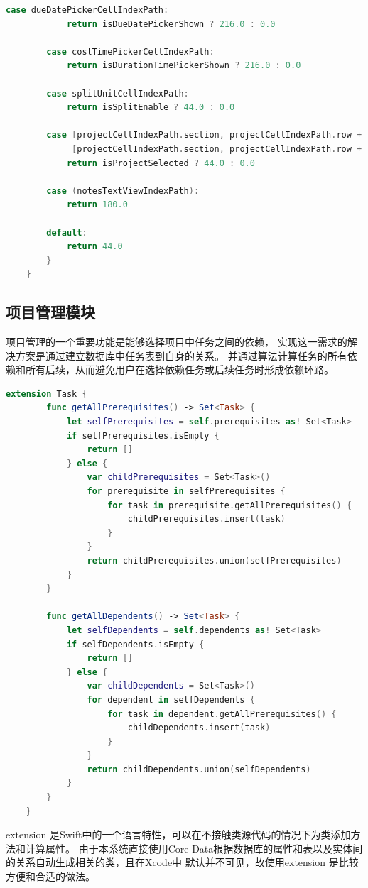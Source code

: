 \begin{lstlisting}[language={Swift}, caption={动态调整行高以便输入}]
        case dueDatePickerCellIndexPath:
            return isDueDatePickerShown ? 216.0 : 0.0
        
        case costTimePickerCellIndexPath:
            return isDurationTimePickerShown ? 216.0 : 0.0
        
        case splitUnitCellIndexPath:
            return isSplitEnable ? 44.0 : 0.0
            
        case [projectCellIndexPath.section, projectCellIndexPath.row + 1],
             [projectCellIndexPath.section, projectCellIndexPath.row + 2]:
            return isProjectSelected ? 44.0 : 0.0
            
        case (notesTextViewIndexPath):
            return 180.0
        
        default:
            return 44.0
        }
    }
\end{lstlisting}

\subsection{项目管理模块}
项目管理的一个重要功能是能够选择项目中任务之间的依赖，
实现这一需求的解决方案是通过建立数据库中任务表到自身的关系。
并通过算法计算任务的所有依赖和所有后续，从而避免用户在选择依赖任务或后续任务时形成依赖环路。

\begin{lstlisting}[language={Swift}, caption={计算任务依赖关系的代码}]
	extension Task {
		func getAllPrerequisites() -> Set<Task> {
			let selfPrerequisites = self.prerequisites as! Set<Task>
			if selfPrerequisites.isEmpty {
				return []
			} else {
				var childPrerequisites = Set<Task>()
				for prerequisite in selfPrerequisites {
					for task in prerequisite.getAllPrerequisites() {
						childPrerequisites.insert(task)
					}
				}
				return childPrerequisites.union(selfPrerequisites)
			}
		}
		
		func getAllDependents() -> Set<Task> {
			let selfDependents = self.dependents as! Set<Task>
			if selfDependents.isEmpty {
				return []
			} else {
				var childDependents = Set<Task>()
				for dependent in selfDependents {
					for task in dependent.getAllPrerequisites() {
						childDependents.insert(task)
					}
				}
				return childDependents.union(selfDependents)
			}
		}
	}
\end{lstlisting}

extension 是Swift中的一个语言特性，可以在不接触类源代码的情况下为类添加方法和计算属性。
由于本系统直接使用Core Data根据数据库的属性和表以及实体间的关系自动生成相关的类，且在Xcode中
默认并不可见，故使用extension 是比较方便和合适的做法。

